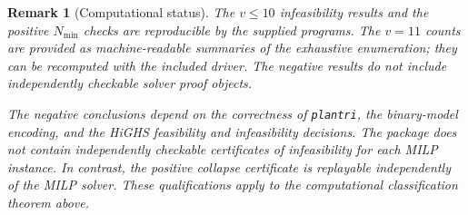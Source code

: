 \documentclass[11pt]{article}
\newtheorem{remark}[theorem]{Remark}
\begin{document}
\begin{remark}[Computational status]\label{rem:computational-status}
The $v\le10$ infeasibility results and the positive $N_{\min}$
checks are reproducible by the supplied programs. The $v=11$ counts
are provided as machine-readable summaries of the exhaustive enumeration;
they can be recomputed with the included driver. The negative results
do not include independently checkable solver proof objects.

The negative conclusions depend on the correctness of \texttt{plantri}, the
binary-model encoding, and the HiGHS feasibility and infeasibility decisions.
The package does not contain independently checkable certificates of
infeasibility for each MILP instance.  In contrast, the positive collapse
certificate is replayable independently of the MILP solver.  These
qualifications apply to the computational classification theorem above.
\end{remark}
\end{document}
